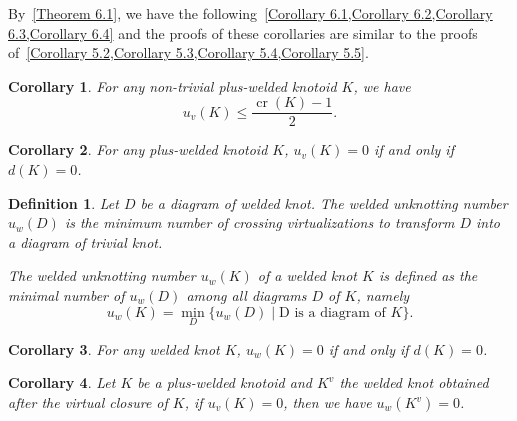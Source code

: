 \documentclass[11pt]{amsart}
\theoremstyle{noparens}
\newtheorem{corollary}{Corollary}[section]
\newtheorem{definition}{Definition}[section]
\numberwithin{equation}{section}
\numberwithin{equation}{section}
\begin{document}
By~\cref{Theorem 6.1}, we have the following~\cref{Corollary 6.1,Corollary 6.2,Corollary 6.3,Corollary 6.4}  and the proofs of these corollaries are similar to the proofs of~\cref{Corollary 5.2,Corollary 5.3,Corollary 5.4,Corollary 5.5}. 

\begin{corollary} \label{Corollary 6.1}
For any non-trivial plus-welded knotoid $K$, we have
$$
u_v(K) \leq \dfrac{\operatorname{cr}(K) - 1}{2}.
$$
\end{corollary}

\begin{corollary} \label{Corollary 6.2}
For any plus-welded knotoid $K$, $u_v(K)=0$ if and only if $d(K)=0$.
\end{corollary}
 
\begin{definition} \citep{Gill2021UnknottingInvariant}
Let $D$ be a diagram of welded knot.
The welded unknotting number $u_w(D)$ is the minimum number of crossing virtualizations to transform $D$ into a diagram of trivial knot. 

The welded unknotting number $u_w(K)$ of a welded knot $K$ is defined as the minimal number of $u_w(D)$ among all diagrams $D$ of $K$, namely
$$
u_w(K)=\min_{D} \{ u_w(D) \mid \text{D is a diagram} \text{ of } K\}.
$$
\end{definition}

\begin{corollary} \label{Corollary 6.3}
For any welded knot $K$, $u_w(K)=0$ if and only if $d(K)=0$.
\end{corollary}

\begin{corollary} \label{Corollary 6.4}
Let $K$ be a plus-welded  knotoid and $K^{v}$ the welded knot obtained after the virtual closure of $K$, if $u_v(K)=0$, then we have $u_w(K^{v})=0$.
\end{corollary}


\normalem 

 
\end{document}
